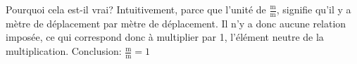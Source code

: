 Pourquoi cela est-il vrai? Intuitivement, parce que l'unité de $\frac{\mathrm{m}}{{\mathrm{m}}}$, signifie qu'il y a mètre de déplacement par mètre de déplacement. Il n'y a donc aucune relation imposée, ce qui correspond donc à multiplier par 1, l'élément neutre de la multiplication. Conclusion: $\frac{\mathrm{m}}{{\mathrm{m}}}=1$
